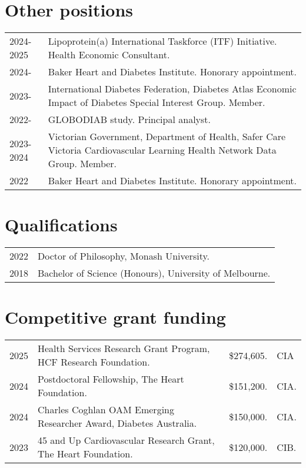\documentclass[11pt]{article}
\begin{document}
\section*{Other positions}
\begin{tabular}{p{2cm}p{14cm}}
2024-2025 & Lipoprotein(a) International Taskforce (ITF) Initiative. Health Economic Consultant. \\
2024- & Baker Heart and Diabetes Institute. Honorary appointment.  \\
2023- & International Diabetes Federation, Diabetes Atlas Economic Impact of Diabetes Special Interest Group. Member. \\
2022- & GLOBODIAB study. Principal analyst.  \\
2023-2024 & Victorian Government, Department of Health, 
Safer Care Victoria Cardiovascular Learning Health Network Data Group. Member. \\
2022 & Baker Heart and Diabetes Institute. Honorary appointment.  \\
\end{tabular}

\section*{Qualifications}
\begin{tabular}{p{2cm}p{14cm}}
2022 & Doctor of Philosophy, Monash University. \\
2018 & Bachelor of Science (Honours), University of Melbourne. \\
\end{tabular}


\section*{Competitive grant funding}
\begin{tabular}{p{2cm}p{11.5cm}p{1.5cm}p{1cm}}
2025 & Health Services Research Grant Program, HCF Research Foundation. & \$274,605. & CIA \\
2024 & Postdoctoral Fellowship, The Heart Foundation. & \$151,200. & CIA. \\
2024 & Charles Coghlan OAM Emerging Researcher Award, Diabetes Australia. & \$150,000. & CIA. \\
2023 & 45 and Up Cardiovascular Research Grant, The Heart Foundation. & \$120,000. & CIB. \\
\end{tabular}
\end{document}
